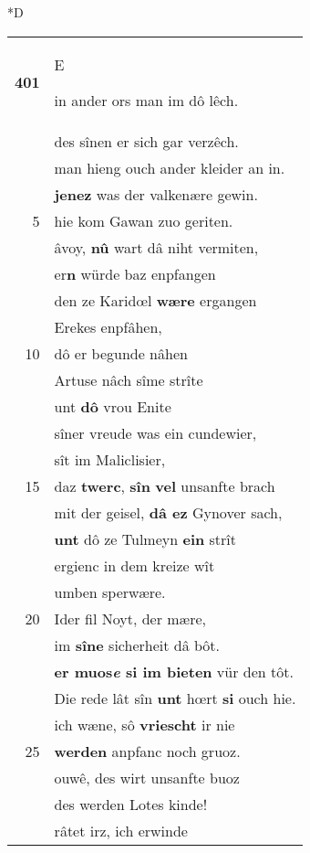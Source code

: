 \documentclass[8pt,a4paper,notitlepage]{article}
\begin{document}
\begin{table}[ht]
\begin{minipage}[t]{0.5\linewidth}
\small
\begin{center}*D
\end{center}
\begin{tabular}{rl}
\textbf{401} & \begin{large}E\end{large}in ander ors man im dô lêch.\\ 
 & des sînen er sich gar verzêch.\\ 
 & man hieng ouch ander kleider an in.\\ 
 & \textbf{jenez} was der valkenære gewin.\\ 
5 & hie kom Gawan zuo geriten.\\ 
 & âvoy, \textbf{nû} wart dâ niht vermiten,\\ 
 & er\textbf{n} würde baz enpfangen\\ 
 & den ze Karidœl \textbf{wære} ergangen\\ 
 & Erekes enpfâhen,\\ 
10 & dô er begunde nâhen\\ 
 & Artuse nâch sîme strîte\\ 
 & unt \textbf{dô} vrou Enite\\ 
 & sîner vreude was ein cundewier,\\ 
 & sît im Maliclisier,\\ 
15 & daz \textbf{twerc}, \textbf{sîn} \textbf{vel} unsanfte brach\\ 
 & mit der geisel, \textbf{dâ ez} Gynover sach,\\ 
 & \textbf{unt} dô ze Tulmeyn \textbf{ein} strît\\ 
 & ergienc in dem kreize wît\\ 
 & umben sperwære.\\ 
20 & Ider fil Noyt, der mære,\\ 
 & im \textbf{sîne} sicherheit dâ bôt.\\ 
 & \textbf{er muos\textit{e} si im bieten} vür den tôt.\\ 
 & Die rede lât sîn \textbf{unt} hœrt \textbf{si} ouch hie.\\ 
 & ich wæne, sô \textbf{vriescht} ir nie\\ 
25 & \textbf{werden} anpfanc noch gruoz.\\ 
 & ouwê, des wirt unsanfte buoz\\ 
 & des werden Lotes kinde!\\ 
 & râtet irz, ich erwinde\\ 

\end{tabular}
\end{minipage}
\end{table}
\end{document}

